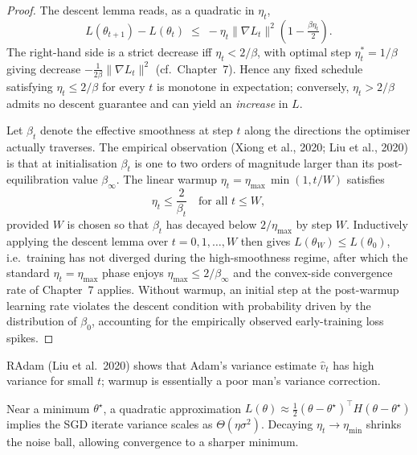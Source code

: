 \begin{proof}
The descent lemma reads, as a quadratic in $\eta_t$,
\[
  L(\theta_{t+1}) - L(\theta_t) \;\le\; -\eta_t\|\nabla L_t\|^2 \left(1 - \tfrac{\beta \eta_t}{2}\right).
\]
The right-hand side is a strict decrease iff $\eta_t < 2/\beta$, with optimal step $\eta_t^* = 1/\beta$ giving decrease $-\tfrac{1}{2\beta}\|\nabla L_t\|^2$ (cf.\ Chapter~7). Hence any fixed schedule satisfying $\eta_t \le 2/\beta$ for every $t$ is monotone in expectation; conversely, $\eta_t > 2/\beta$ admits no descent guarantee and can yield an \emph{increase} in $L$.

Let $\beta_t$ denote the effective smoothness at step $t$ along the directions the optimiser actually traverses. The empirical observation (Xiong et al., 2020; Liu et al., 2020) is that at initialisation $\beta_t$ is one to two orders of magnitude larger than its post-equilibration value $\beta_\infty$. The linear warmup $\eta_t = \eta_{\max}\,\min(1, t / W)$ satisfies
\[
  \eta_t \le \frac{2}{\beta_t} \quad\text{for all } t \le W,
\]
provided $W$ is chosen so that $\beta_t$ has decayed below $2/\eta_{\max}$ by step $W$. Inductively applying the descent lemma over $t = 0, 1, \ldots, W$ then gives $L(\theta_{W}) \le L(\theta_0)$, i.e.\ training has not diverged during the high-smoothness regime, after which the standard $\eta_t = \eta_{\max}$ phase enjoys $\eta_{\max} \le 2/\beta_\infty$ and the convex-side convergence rate of Chapter~7 applies. Without warmup, an initial step at the post-warmup learning rate violates the descent condition with probability driven by the distribution of $\beta_0$, accounting for the empirically observed early-training loss spikes.
\end{proof}

\begin{remark}
RAdam (Liu et al.\ 2020) shows that Adam's variance estimate $\hat v_t$ has high variance for small $t$; warmup is essentially a poor man's variance correction.
\end{remark}

\begin{theorem}
Near a minimum $\theta^\star$, a quadratic approximation $L(\theta)\approx\tfrac{1}{2}(\theta-\theta^\star)^\top H(\theta-\theta^\star)$ implies the SGD iterate variance scales as $\Theta(\eta\sigma^2)$. Decaying $\eta_t\to\eta_{\min}$ shrinks the noise ball, allowing convergence to a sharper minimum.
\end{theorem}

